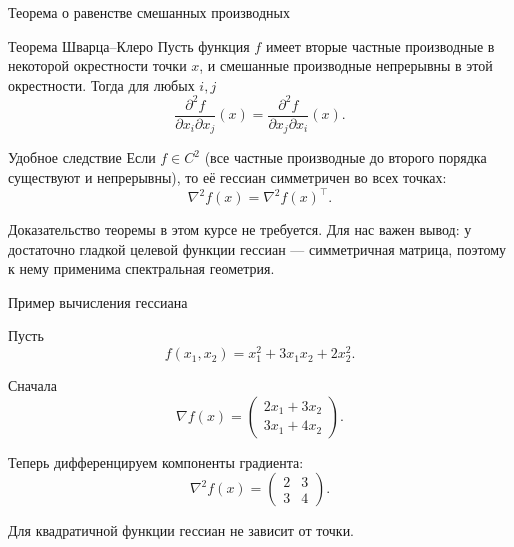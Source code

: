 \documentclass[aspectratio=169,10pt]{beamer}
\newcommand{\grad}{\nabla}
\newcommand{\Hess}{\nabla^2}
\begin{document}

\begin{frame}{Теорема о равенстве смешанных производных}
\small
\vspace{0.20em}

\begin{block}{Теорема Шварца--Клеро}
Пусть функция $f$ имеет вторые частные производные в некоторой окрестности точки $x$, и смешанные производные непрерывны в этой окрестности. Тогда для любых $i,j$
\[
  \boxed{
  \frac{\partial^2 f}{\partial x_i\partial x_j}(x)
  =
  \frac{\partial^2 f}{\partial x_j\partial x_i}(x).
  }
\]
\end{block}

\begin{block}{Удобное следствие}
Если $f\in C^2$ (все частные производные до второго порядка существуют и непрерывны), то её гессиан симметричен во всех точках:
\[
  \boxed{\Hess f(x)=\Hess f(x)^\top.}
\]
\end{block}

\small
Доказательство теоремы в этом курсе не требуется. Для нас важен вывод: у достаточно гладкой целевой функции гессиан --- симметричная матрица, поэтому к нему применима спектральная геометрия.

\end{frame}

\begin{frame}{Пример вычисления гессиана}
\vspace{0.4em}

Пусть
\[
 f(x_1,x_2)=x_1^2+3x_1x_2+2x_2^2.
\]

Сначала
\[
 \grad f(x)=
 \begin{pmatrix}
  2x_1+3x_2\\
  3x_1+4x_2
 \end{pmatrix}.
\]

Теперь дифференцируем компоненты градиента:
\[
 \boxed{
 \Hess f(x)=
 \begin{pmatrix}
  2&3\\
  3&4
 \end{pmatrix}.
 }
\]

\small
Для квадратичной функции гессиан не зависит от точки.

\end{frame}
\end{document}

